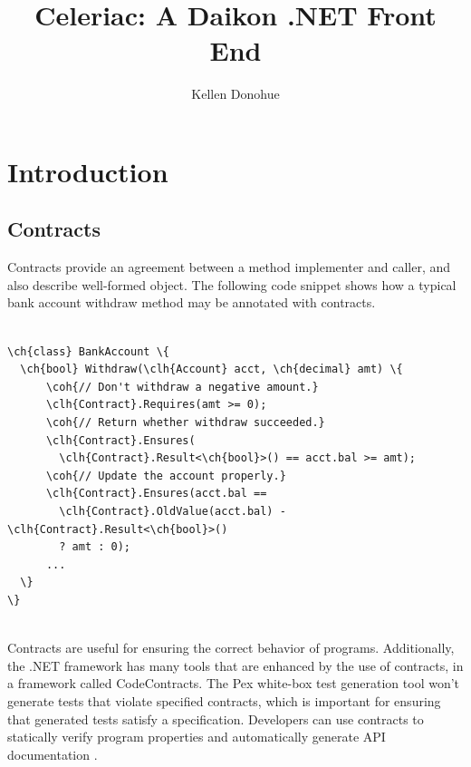 \documentclass{article}
\title{Celeriac: A Daikon .NET Front End}
\author{Kellen Donohue}
\newcommand\ch[1]{\textcolor[rgb]{0,0,1}{\textbf{#1}}}
\newcommand\clh[1]{\textcolor[rgb]{0,.5,1}{\textbf{#1}}}
\newcommand\coh[1]{\textcolor[rgb]{0,.6,0}{\textbf{#1}}}
\begin{document}
\maketitle


\section{Introduction}
\subsection{Contracts}
Contracts provide an agreement between a method implementer and caller, and also describe well-formed object. The following code snippet shows how a typical bank account withdraw method may be annotated with contracts.
\begin{center}
\begin{Verbatim}[commandchars=\\\{\}]

\ch{class} BankAccount \{
  \ch{bool} Withdraw(\clh{Account} acct, \ch{decimal} amt) \{
      \coh{// Don't withdraw a negative amount.}
      \clh{Contract}.Requires(amt >= 0);
      \coh{// Return whether withdraw succeeded.}
      \clh{Contract}.Ensures(
        \clh{Contract}.Result<\ch{bool}>() == acct.bal >= amt);
      \coh{// Update the account properly.}
      \clh{Contract}.Ensures(acct.bal ==
        \clh{Contract}.OldValue(acct.bal) - \clh{Contract}.Result<\ch{bool}>()
        ? amt : 0);
      ...
  \}
\}
\end{Verbatim}
\end{center} 
\  \\
Contracts are useful for ensuring the correct behavior of programs. Additionally, the .NET framework has many tools that are enhanced by the use of contracts, in a framework called CodeContracts. The Pex white-box test generation tool \cite{pex} won't generate tests that violate specified contracts, which is important for ensuring that generated tests satisfy a specification. Developers can use contracts to statically verify program properties \cite{static} and automatically generate API documentation \cite{contracts}.
\end{document}
